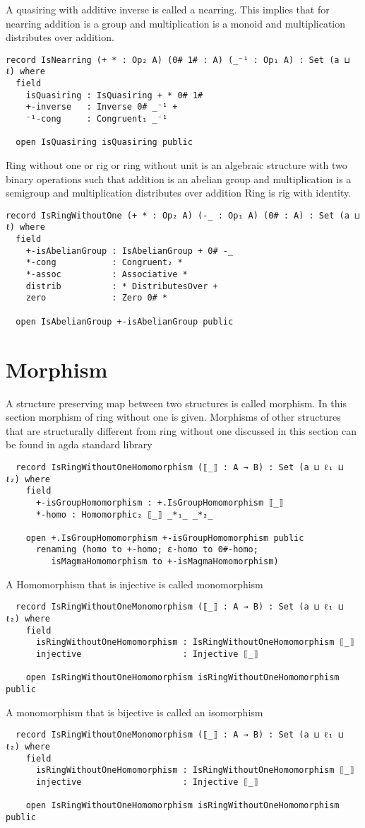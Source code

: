 A quasiring with additive inverse is called a nearring. This implies that for nearring addition is a group and multiplication is a monoid and multiplication distributes over addition.

\begin{Verbatim}
record IsNearring (+ * : Op₂ A) (0# 1# : A) (_⁻¹ : Op₁ A) : Set (a ⊔ ℓ) where
  field
    isQuasiring : IsQuasiring + * 0# 1#
    +-inverse   : Inverse 0# _⁻¹ +
    ⁻¹-cong     : Congruent₁ _⁻¹

  open IsQuasiring isQuasiring public
\end{Verbatim}

Ring without one or rig or ring without unit is an algebraic structure with two binary operations such that addition is an abelian group and multiplication is a semigroup and multiplication distributes over addition Ring is rig with identity.
\begin{Verbatim}
record IsRingWithoutOne (+ * : Op₂ A) (-_ : Op₁ A) (0# : A) : Set (a ⊔ ℓ) where
  field
    +-isAbelianGroup : IsAbelianGroup + 0# -_
    *-cong           : Congruent₂ *
    *-assoc          : Associative *
    distrib          : * DistributesOver +
    zero             : Zero 0# *

  open IsAbelianGroup +-isAbelianGroup public
\end{Verbatim}
\section{Morphism} 
A structure preserving map between two structures is called morphism. In this section morphism of ring without one is given. Morphisms of other structures that are structurally different from ring without one discussed in this section can be found in agda standard library
\begin{Verbatim}
  record IsRingWithoutOneHomomorphism (⟦_⟧ : A → B) : Set (a ⊔ ℓ₁ ⊔ ℓ₂) where
    field
      +-isGroupHomomorphism : +.IsGroupHomomorphism ⟦_⟧
      *-homo : Homomorphic₂ ⟦_⟧ _*₁_ _*₂_

    open +.IsGroupHomomorphism +-isGroupHomomorphism public
      renaming (homo to +-homo; ε-homo to 0#-homo;
		 isMagmaHomomorphism to +-isMagmaHomomorphism)
\end{Verbatim} 
A Homomorphism that is injective is called monomorphism 
\begin{Verbatim}
  record IsRingWithoutOneMonomorphism (⟦_⟧ : A → B) : Set (a ⊔ ℓ₁ ⊔ ℓ₂) where
    field
      isRingWithoutOneHomomorphism : IsRingWithoutOneHomomorphism ⟦_⟧
      injective                    : Injective ⟦_⟧

    open IsRingWithoutOneHomomorphism isRingWithoutOneHomomorphism public
\end{Verbatim}
A monomorphism that is bijective is called an isomorphism
\begin{Verbatim}
  record IsRingWithoutOneMonomorphism (⟦_⟧ : A → B) : Set (a ⊔ ℓ₁ ⊔ ℓ₂) where
    field
      isRingWithoutOneHomomorphism : IsRingWithoutOneHomomorphism ⟦_⟧
      injective                    : Injective ⟦_⟧

    open IsRingWithoutOneHomomorphism isRingWithoutOneHomomorphism public
\end{Verbatim}
